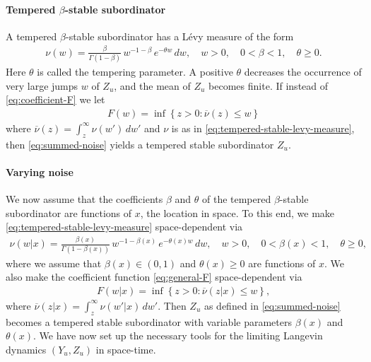 \documentclass[a4paper,12pt]{elsarticle}
\numberwithin{equation}{section}
\theoremstyle{plain}
\theoremstyle{definition}
\theoremstyle{remark}
\numberwithin{equation}{section}
\newcommand{\1}{\mathbf 1}
\begin{document}
\paragraph{Tempered $\beta$-stable subordinator}
A tempered $\beta$-stable subordinator has a L\'evy measure of the form
\begin{align}
  \label{eq:tempered-stable-levy-measure}
  \nu(w) = \frac{\beta}{\Gamma(1-\beta)}\, w^{-1-\beta}\,e^{-\theta w}\,dw, 
  \quad w > 0, \quad 0 < \beta < 1, \quad \theta \ge 0. 
\end{align}
Here $\theta$ is called the tempering parameter. A positive $\theta$ decreases 
the occurrence of very large jumps $w$ of $Z_u$, and the mean of $Z_u$ becomes 
finite.  If instead of \eqref{eq:coefficient-F} we let 
\begin{align} \label{eq:general-F}
  F(w) = \inf\left\lbrace z > 0: \overline \nu(z) \le w \right\rbrace
\end{align}
where $\overline \nu(z) = \int_z^\infty \nu(w')\,dw'$ and $\nu$ is as in \eqref{eq:tempered-stable-levy-measure}, then 
\eqref{eq:summed-noise}
yields a tempered stable subordinator $Z_u$.

\paragraph{Varying noise}
We now assume that the coefficients $\beta$ and $\theta$ of the tempered 
$\beta$-stable subordinator are functions of $x$, the location in space. 
To this end, we make 
\eqref{eq:tempered-stable-levy-measure} space-dependent via
\begin{align}
  \label{eq:varying-tempered-stable-levy-measure}
  \nu(w | x) = \frac{\beta(x)}{\Gamma(1-\beta(x))}\, 
  w^{-1-\beta(x)}\,e^{-\theta(x) w}\,dw, 
  \quad w > 0, \quad 0 < \beta(x) < 1, \quad \theta \ge 0, 
\end{align}
where we assume that $\beta(x) \in (0,1)$ and $\theta(x) \ge 0$ are  
functions of $x$.
We also make the coefficient function \eqref{eq:general-F} space-dependent via
\begin{align} \label{eq:varying-general-F}
  F(w|x) = \inf\left\lbrace z > 0: \overline \nu(z | x) \le w 
  \right\rbrace,
\end{align}
where $\overline \nu(z | x) = \int_z^\infty \nu(w'|x)\,dw'$.
Then $Z_u$ as defined in \eqref{eq:summed-noise} becomes a tempered stable 
subordinator with variable parameters $\beta(x)$ and $\theta(x)$. 
We have now set up the necessary tools for the limiting Langevin 
dynamics $(Y_u, Z_u)$ in space-time.
\end{document}

